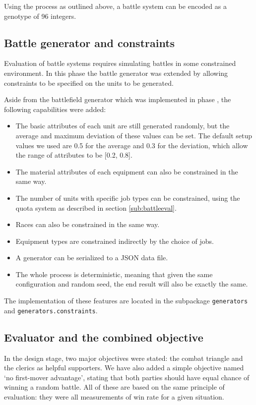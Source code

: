 Using the process as outlined above, a battle system can be encoded as a genotype of 96 integers.

\subsection{Battle generator and constraints}

Evaluation of battle systems requires simulating battles in some constrained environment. In this phase the battle generator was extended by allowing constraints to be specified on the units to be generated.

Aside from the battlefield generator which was implemented in phase , the following capabilities were added:
\begin{itemize}
	\item The basic attributes of each unit are still generated randomly, but the average and maximum deviation of these values can be set. The default setup values we used are 0.5 for the average and 0.3 for the deviation, which allow the range of attributes to be [0.2, 0.8].
	\item The material attributes of each equipment can also be constrained in the same way.
	\item The number of units with specific job types can be constrained, using the quota system as described in section \ref{sub:battleeval}.
	\item Races can also be constrained in the same way.
	\item Equipment types are constrained indirectly by the choice of jobs.
	\item A generator can be serialized to a JSON data file.
	\item The whole process is deterministic, meaning that given the same configuration and random seed, the end result will also be exactly the same.
\end{itemize}

The implementation of these features are located in the subpackage \texttt{generators} and \texttt{generators.constraints}.

\subsection{Evaluator and the combined objective}

In the design stage, two major objectives were stated: the combat triangle and the clerics as helpful supporters. We have also added a simple objective named `no first-mover advantage', stating that both parties should have equal chance of winning a random battle. All of these are based on the same principle of evaluation: they were all measurements of win rate for a given situation.

